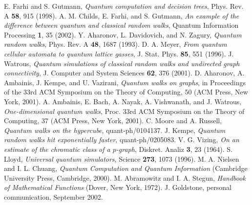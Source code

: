 \documentclass[aps,11pt,twoside,nofootinbib,tightenlines,superscriptaddress,preprintnumbers]{revtex4}
\newcommand{\<}{\langle}
\renewcommand{\>}{\rangle}
\newcommand{\qph}[1]{quant-ph/#1}
\begin{document}
\begin{thebibliography}{}
  E. Farhi and S. Gutmann,
  {\em Quantum computation and decision trees},
  Phys. Rev. A {\bf 58}, 915 (1998).
  A. M. Childs, E. Farhi, and S. Gutmann,
  {\em An example of the difference between quantum and classical random
  walks},
  Quantum Information Processing {\bf 1}, 35 (2002).
  Y. Aharonov, L. Davidovich, and N. Zagury,
  {\em Quantum random walks},
  Phys. Rev. A {\bf 48}, 1687 (1993).
  D. A. Meyer, 
  {\em From quantum cellular automata to quantum lattice gasses}, 
  J. Stat. Phys. {\bf 85}, 551 (1996).
  J. Watrous, 
  {\em Quantum simulations of classical random walks and undirected 
  graph connectivity},
  J. Computer and System Sciences {\bf 62}, 376 (2001).
  D. Aharonov, A. Ambainis, J. Kempe, and U. Vazirani, 
  {\em Quantum walks on graphs}, 
  in Proceedings of the 33rd ACM Symposium on the Theory of Computing, 50
  (ACM Press, New York, 2001).
  A. Ambainis, E. Bach, A. Nayak, A. Vishwanath, and J. Watrous, 
  {\em One-dimensional quantum walks}, 
  Proc. 33rd ACM Symposium on the Theory of Computing, 37 (ACM Press, New
  York, 2001).  
  C. Moore and A. Russell,
  {\em Quantum walks on the hypercube},
  \qph{0104137}.
  J. Kempe,
  {\em Quantum random walks hit exponentially faster},
  \qph{0205083}.
  V. G. Vizing,
  {\em On an estimate of the chromatic class of a $p$-graph}, Diskret.
  Analiz {\bf 3}, 23 (1964).
  S. Lloyd,
  {\em Universal quantum simulators},
  Science {\bf 273}, 1073 (1996).
  M. A. Nielsen and I. L. Chuang,
  {\em Quantum Computation and Quantum Information}
  (Cambridge University Press, Cambridge, 2000).
  M. Abramowitz and I. A. Stegun, 
  {\em Handbook of Mathematical Functions}
  (Dover, New York, 1972).
  J. Goldstone, personal communication, September 2002.
\end{thebibliography}
\end{document}
